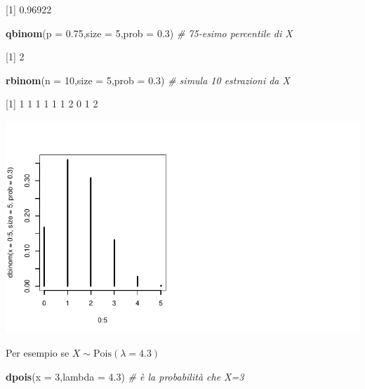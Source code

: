\documentclass[
  11pt,
]{book}
\newenvironment{Shaded}{\begin{snugshade}}{\end{snugshade}}
\newcommand{\AttributeTok}[1]{\textcolor[rgb]{0.13,0.29,0.53}{#1}}
\newcommand{\CommentTok}[1]{\textcolor[rgb]{0.56,0.35,0.01}{\textit{#1}}}
\newcommand{\DecValTok}[1]{\textcolor[rgb]{0.00,0.00,0.81}{#1}}
\newcommand{\FloatTok}[1]{\textcolor[rgb]{0.00,0.00,0.81}{#1}}
\newcommand{\FunctionTok}[1]{\textcolor[rgb]{0.13,0.29,0.53}{\textbf{#1}}}
\newcommand{\NormalTok}[1]{#1}
\theoremstyle{mytheoremstyle}
\theoremstyle{mydefstyle}
\begin{document}
{[}1{]} 0.96922

\begin{Shaded}
\begin{Highlighting}[]
\FunctionTok{qbinom}\NormalTok{(}\AttributeTok{p =} \FloatTok{0.75}\NormalTok{,}\AttributeTok{size =} \DecValTok{5}\NormalTok{,}\AttributeTok{prob =} \FloatTok{0.3}\NormalTok{) }\CommentTok{\# 75{-}esimo percentile di X}
\end{Highlighting}
\end{Shaded}

{[}1{]} 2

\begin{Shaded}
\begin{Highlighting}[]
\FunctionTok{rbinom}\NormalTok{(}\AttributeTok{n =} \DecValTok{10}\NormalTok{,}\AttributeTok{size =} \DecValTok{5}\NormalTok{,}\AttributeTok{prob =} \FloatTok{0.3}\NormalTok{)  }\CommentTok{\# simula 10 estrazioni da X}
\end{Highlighting}
\end{Shaded}

{[}1{]} 1 1 1 1 1 1 2 0 1 2

\begin{center}\includegraphics{Appunti_di_Statistica_2025_files/figure-latex/24-Libro-40,-1} \end{center}

Per esempio se \(X\sim\text{Pois}(\lambda=4.3)\)

\begin{Shaded}
\begin{Highlighting}[]
\FunctionTok{dpois}\NormalTok{(}\AttributeTok{x =} \DecValTok{3}\NormalTok{,}\AttributeTok{lambda =} \FloatTok{4.3}\NormalTok{) }\CommentTok{\# è la probabilità che X=3}
\end{Highlighting}
\end{Shaded}
\end{document}
